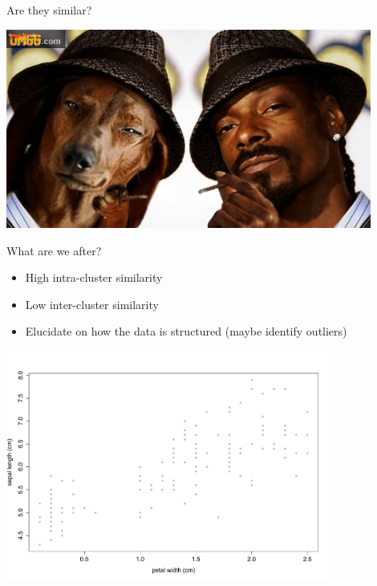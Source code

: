 \documentclass[pdf]{beamer}
\begin{document}
\begin{frame}{Are they similar?}
\begin{center}
	\includegraphics[width=0.9\textwidth]{snoopDog.jpg}
\end{center}
\end{frame}
\begin{frame}{What are we after?}
\begin{itemize}
	\item High intra-cluster similarity
	\item Low inter-cluster similarity
	\item Elucidate on how the data is structured (maybe identify outliers)
\end{itemize}
\begin{center}
	\includegraphics[width=0.8\textwidth]{samplePlot.pdf}
\end{center}
\end{frame}
\end{document}
